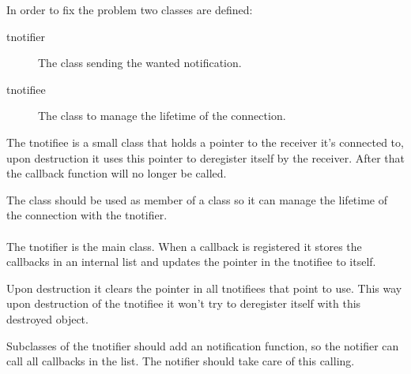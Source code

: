 In order to fix the problem two classes are defined:

\begin{description}
\item[tnotifier] The class sending the wanted notification.
\item[tnotifiee] The class to manage the lifetime of the connection.
\end{description}

The tnotifiee is a small class that holds a pointer to the receiver it's
connected to, upon destruction it uses this pointer to deregister itself by the
receiver. After that the callback function will no longer be called.

The class should be used as member of a class so it can manage the lifetime of
the connection with the tnotifier.

\paragraph{}

The tnotifier is the main class. When a callback is registered it stores the
callbacks in an internal list and updates the pointer in the tnotifiee to
itself.

Upon destruction it clears the pointer in all tnotifiees that point to use. This
way upon destruction of the tnotifiee it won't try to deregister itself with
this destroyed object.

Subclasses of the tnotifier should add an notification function, so the notifier
can call all callbacks in the list. The notifier should take care of this
calling.


